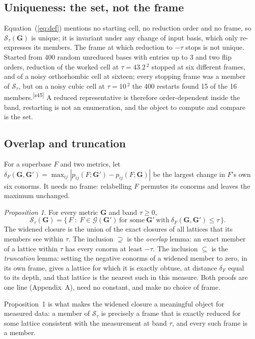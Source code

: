 \documentclass[preprint,pdf]{iucr}          %
\newcommand{\Ang}{\text{\AA}}
\newcommand{\Gmet}{\mathbf{G}}
\newcommand{\Sw}{\mathcal{S}_\tau}
\newcommand{\Cl}{\mathcal{G}}
\newcommand{\chk}[1]{\textsuperscript{[#1]}}
\begin{document}
\subsection{Uniqueness: the set, not the frame}
\label{sec:unique}
Equation~(\ref{eq:def}) mentions no starting cell, no reduction order and no frame, so $\Sw(\Gmet)$ is unique; it is invariant under any change of input basis, which only re-expresses its members. The frame at which reduction to $-\tau$ stops is not unique. Started from 400 random unreduced bases with entries up to 3 and two flip orders, reduction of the worked cell at $\tau=43.2$\,\Ang$^2$ stopped at six different frames, and of a noisy orthorhombic cell at sixteen; every stopping frame was a member of $\Sw$, but on a noisy cubic cell at $\tau=10$\,\Ang$^2$ the 400 restarts found 15 of the 16 members.\chk{z45} A reduced representative is therefore order-dependent inside the band, restarting is not an enumeration, and the object to compute and compare is the set.

\subsection{Overlap and truncation}
\label{sec:overlap}
For a superbase $F$ and two metrics, let $\delta_F(\Gmet,\Gmet')=\max_{ij}|p_{ij}(F;\Gmet')-p_{ij}(F;\Gmet)|$ be the largest change in $F$'s own six conorms. It needs no frame: relabelling $F$ permutes its conorms and leaves the maximum unchanged.

\emph{Proposition 1.} For every metric $\Gmet$ and band $\tau\ge0$,
\begin{equation}
\Sw(\Gmet)=\bigl\{\,F\;:\;F\in\Cl(\Gmet')\ \text{for some}\ \Gmet'\ \text{with}\ \delta_F(\Gmet,\Gmet')\le\tau\,\bigr\}.
\label{eq:union}
\end{equation}
The widened closure is the union of the exact closures of all lattices that its members see within $\tau$. The inclusion $\supseteq$ is the \emph{overlap} lemma: an exact member of a lattice within $\tau$ has every conorm at least $-\tau$. The inclusion $\subseteq$ is the \emph{truncation} lemma: setting the negative conorms of a widened member to zero, in its own frame, gives a lattice for which it is exactly obtuse, at distance $\delta_F$ equal to its depth, and that lattice is the nearest such in this measure. Both proofs are one line (Appendix~A), need no constant, and make no choice of frame.

Proposition~1 is what makes the widened closure a meaningful object for measured data: a member of $\Sw$ is precisely a frame that is exactly reduced for some lattice consistent with the measurement at band $\tau$, and every such frame is a member.
\end{document}
